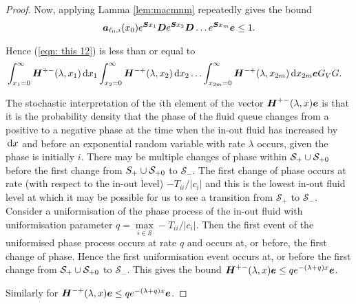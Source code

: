 \begin{proof}
	Now, applying Lamma \ref{lem:macmnm} repeatedly gives the bound  
	\[\boldsymbol   a_{\ell_0,i}(x_0)e^{\boldsymbol{S}x_1}\boldsymbol{D}e^{\boldsymbol{S}x_2} \boldsymbol{D}\dots e^{\boldsymbol{S}x_m} \boldsymbol e \leq 1.\]

	Hence (\ref{eqn: this 12}) is less than or equal to 
	\begin{align}
		& \int_{x_1=0}^\infty \boldsymbol H^{+-}(\lambda,x_1) \, \mathrm{d} x_1 \int_{x_2=0}^\infty \boldsymbol H^{-+}(\lambda,x_2)  \, \mathrm{d} x_2  
                	\hdots \int_{x_{2m}=0}^\infty \boldsymbol H^{-+}(\lambda, x_{2m})\, \mathrm{d} x_{2m}\boldsymbol e G_VG. \label{eqn: this 123}
        \end{align}
	        
        The stochastic interpretation of the \(i\)th element of the vector \(\boldsymbol H^{+-}(\lambda,x)\boldsymbol e\) is that it is the probability density that the phase of the fluid queue changes from a positive to a negative phase at the time when the in-out fluid has increased by \(\, \mathrm{d} x\) and before an exponential random variable with rate \(\lambda\) occurs, given the phase is initially \(i\). There may be multiple changes of phase within \(\mathcal S_+\cup\mathcal{S}_{+0}\) before the first change from \(\mathcal \mathcal S_+\cup\mathcal{S}_{+0}\) to \(\mathcal S_-\). The first change of phase occurs at rate (with respect to the in-out level) \(-T_{ii}/|c_i|\) and this is the lowest in-out fluid level at which it may be possible for us to see a transition from \(\mathcal S_+\) to \(\mathcal S_-\). Consider a uniformisation of the phase process of the in-out fluid with uniformisation parameter \(q = \max\limits_{i\in\mathcal S}-T_{ii}/|c_i|\). Then the first event of the uniformised phase process occurs at rate \(q\) and occurs at, or before, the first change of phase. Hence the first uniformisation event occurs at, or before the first change from \(\mathcal S_+\cup\mathcal{S}_{+0}\) to \(\mathcal S_-\). This gives the bound \(\boldsymbol H^{+-}(\lambda,x)\boldsymbol e\leq qe^{-(\lambda + q)x}\boldsymbol e\).
        
        Similarly for \(\boldsymbol H^{-+}(\lambda,x)\boldsymbol e\leq qe^{-(\lambda + q)x}\boldsymbol e\).
        

\end{proof}
